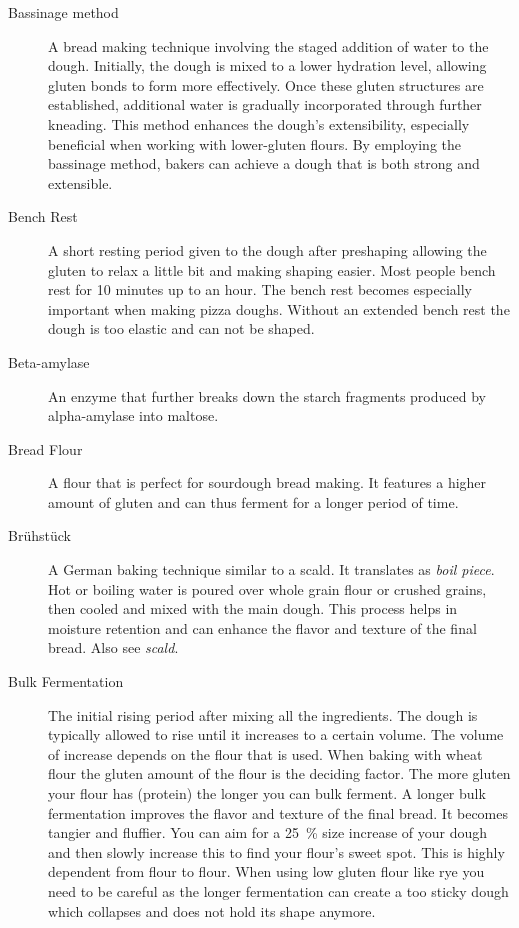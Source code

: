 \begin{description}
\item[Bassinage method] A bread making technique involving the staged addition of water
to the dough. Initially, the dough is mixed to a lower hydration level,
allowing gluten bonds to form more effectively. Once these gluten structures
are established, additional water is gradually incorporated through further
kneading. This method enhances the dough's extensibility, especially beneficial
when working with lower-gluten flours. By employing the bassinage method,
bakers can achieve a dough that is both strong and extensible.

\item[Bench Rest] A short resting period given to the dough after preshaping
allowing the gluten to relax a little bit and making shaping easier. Most people
bench rest for 10 minutes up to an hour. The bench rest becomes especially important
when making pizza doughs. Without an extended bench rest the dough is too elastic and
can not be shaped.

\item[Beta-amylase] An enzyme that further breaks down the starch fragments
produced by alpha-amylase into maltose.

\item[Bread Flour] A flour that is perfect for sourdough bread making. It features
a higher amount of gluten and can thus ferment for a longer period of time.

\item[Brühstück] A German baking technique similar to a scald. It translates as
\emph{boil piece}. Hot or boiling water is poured over whole grain flour or crushed grains,
then cooled and mixed with the main dough. This process helps in moisture retention
and can enhance the flavor and texture of the final bread. Also see \emph{scald}.

\item[Bulk Fermentation] The initial rising period after mixing all the
    ingredients.  The dough is typically allowed to rise until it increases to
    a certain volume. The volume of increase depends on the flour that is
    used. When baking with wheat flour the gluten amount of the flour is the
    deciding factor. The more gluten your flour has (protein) the longer you
    can bulk ferment. A longer bulk fermentation improves the flavor and
    texture of the final bread. It becomes tangier and fluffier. You can aim
    for a \SI{25}{\percent} size increase of your dough and then slowly
    increase this to find your flour's sweet spot. This is highly dependent
    from flour to flour. When using low gluten flour like rye you need to be
    careful as the longer fermentation can create a too sticky dough which
    collapses and does not hold its shape anymore.


\end{description}
